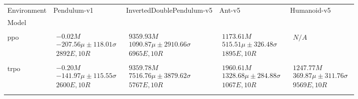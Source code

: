\begin{tabular}{|l|p{3.2cm}|p{3.2cm}|p{3.2cm}|p{3.2cm}|}
\toprule
Environment & Pendulum-v1 & InvertedDoublePendulum-v5 & Ant-v5 & Humanoid-v5 \\
Model &  &  &  &  \\
\midrule \\ \hline
ppo & $\begin{array}{c} -0.02M \\ -207.56\mu \pm 118.01\sigma \\ 2892E, 10R \end{array}$ & $\begin{array}{c} 9359.93M \\ 1090.87\mu \pm 2910.66\sigma \\ 6965E, 10R \end{array}$ & $\begin{array}{c} 1173.61M \\ 515.51\mu \pm 326.48\sigma \\ 1895E, 10R \end{array}$ & $\begin{array}{c} N/A \end{array}$ \\ \\ \hline
trpo & $\begin{array}{c} -0.20M \\ -141.97\mu \pm 115.55\sigma \\ 2600E, 10R \end{array}$ & $\begin{array}{c} 9359.78M \\ 7516.76\mu \pm 3879.62\sigma \\ 5767E, 10R \end{array}$ & $\begin{array}{c} 1960.61M \\ 1328.68\mu \pm 284.88\sigma \\ 1067E, 10R \end{array}$ & $\begin{array}{c} 1247.77M \\ 369.87\mu \pm 311.76\sigma \\ 9569E, 10R \end{array}$ \\ \\ \hline

\end{tabular}
